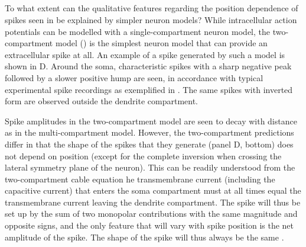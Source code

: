 \subsection{}
\label{sec:Spikes:two-compartment}
To what extent can the qualitative features regarding the position dependence of spikes seen 
in  be explained by simpler neuron models? 
While intracellular action potentials can be modelled with a single-compartment neuron model, 
the two-compartment model () 
is the simplest neuron model that can provide an extracellular spike at all. 
An example of a spike generated by such a model is shown in D. 
Around the soma, characteristic spikes with a sharp negative peak followed by a slower positive hump are seen, 
in accordance with typical experimental spike recordings as exemplified in . 
The same spikes with inverted form are observed outside the dendrite compartment. 

Spike amplitudes in the two-compartment model are seen to decay with distance as in the multi-compartment model. 
However, the two-compartment predictions differ in that the shape of the spikes that they generate (panel D, bottom) 
does not depend on position (except for the complete inversion when crossing the lateral symmetry plane of the neuron). 
This can be readily understood from the two-compartment cable equation   
 he transmembrane current (including the capacitive current) that enters the soma compartment must at all times equal the transmembrane current leaving the dendrite compartment. The spike will thus be set up by the sum of two monopolar contributions with the same magnitude and opposite signs, and the only feature that will vary with spike position is the net amplitude of the spike. The shape of the spike will thus always be the same . 

